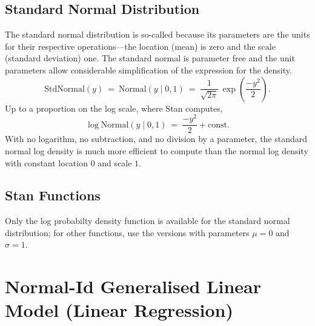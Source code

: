 \begin{description}
{\begin{description}
\begin{description}    \end{description}


\subsection{Standard Normal Distribution}


The standard normal distribution is so-called because its parameters are the units for their respective operations---the location (mean) is zero and the scale (standard deviation) one.  The standard normal is parameter free and the unit parameters allow considerable simplification of the expression for the density. \[ \text{StdNormal}(y) \ = \ \text{Normal}(y \mid 0, 1) \ = \ \frac{1}{\sqrt{2 \pi}} \, \exp \left( \frac{-y^2}{2} \right)\!. \] Up to a proportion on the log scale, where Stan computes, \[ \log \text{Normal}(y \mid 0, 1) \ = \ \frac{-y^2}{2} + \text{const}. \] With no logarithm, no subtraction, and no division by a parameter, the standard normal log density is much more efficient to compute than the normal log density with constant location $0$ and scale $1$.


\subsection{Stan Functions}


Only the log probabilty density function is available for the standard normal distribution; for other functions, use the  versions with parameters $\mu = 0$ and $\sigma = 1$.


\begin{description}  \end{description}




\section{Normal-Id Generalised Linear Model (Linear Regression)}\label{normal-id-glm.section}



\end{description}}
\end{description}
